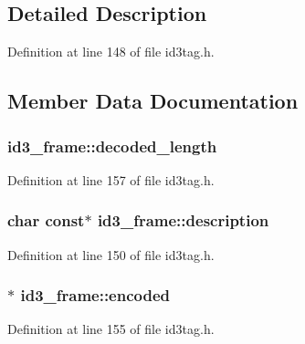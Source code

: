 \subsection{Detailed Description}


Definition at line 148 of file id3tag.\+h.



\subsection{Member Data Documentation}
\subsubsection[{\texorpdfstring{decoded\+\_\+length}{decoded_length}}]{ id3\+\_\+frame\+::decoded\+\_\+length}\hypertarget{structid3__frame_a44643cee724541f9741ab25df6fab6ad}{}\label{structid3__frame_a44643cee724541f9741ab25df6fab6ad}


Definition at line 157 of file id3tag.\+h.

\subsubsection[{\texorpdfstring{description}{description}}]{\setlength{\rightskip}{0pt plus 5cm}char {\bf const}$\ast$ id3\+\_\+frame\+::description}\hypertarget{structid3__frame_aa0b1abe398eb62b8a0a164937cb09543}{}\label{structid3__frame_aa0b1abe398eb62b8a0a164937cb09543}


Definition at line 150 of file id3tag.\+h.

\subsubsection[{\texorpdfstring{encoded}{encoded}}]{$\ast$ id3\+\_\+frame\+::encoded}\hypertarget{structid3__frame_a4109da3f8fb16809bd853d3bacbabe8d}{}\label{structid3__frame_a4109da3f8fb16809bd853d3bacbabe8d}


Definition at line 155 of file id3tag.\+h.

